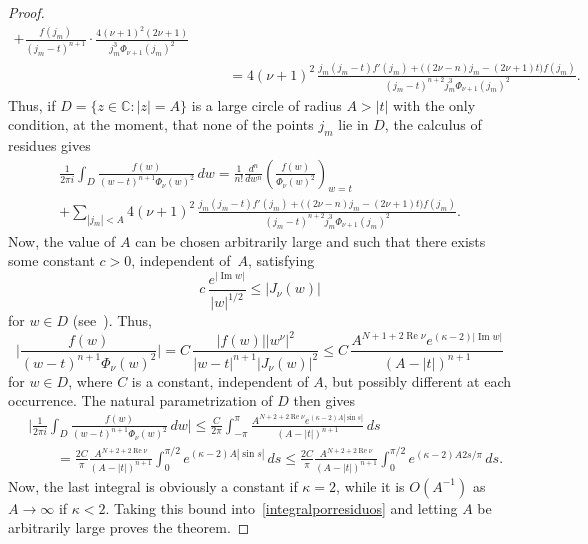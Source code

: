 \documentclass[10pt,leqno,a4paper]{article}
\theoremstyle{plain}
\newcommand{\CC}{\mathbb{C}}
\renewcommand{\Im}{\operatorname{Im}}
\renewcommand{\Re}{\operatorname{Re}}
\numberwithin{equation}{section}
\begin{document}
\begin{proof}
\begin{align*}
   + \frac{f(j_m)}{(j_m-t)^{n+1}}
   \cdot \frac{4 (\nu+1)^2 (2\nu+1)}{j_m^3 \Phi_{\nu+1}(j_m)^2}
   \\
   &\qquad= 4(\nu+1)^2 \, \frac{j_m (j_m-t) f'(j_m) + \big((2\nu-n) j_m - (2\nu+1) t\big) f(j_m)}
   {(j_m-t)^{n+2} j_m^3 \Phi_{\nu+1}(j_m)^2}.
\end{align*}
Thus, if $D = \{z \in \CC : |z| = A\}$ is a large circle of radius $A > |t|$ with the only condition, at the moment, that none of the points $j_m$ lie in $D$, the calculus of residues gives
\begin{multline}
\label{integralporresiduos}
   \frac{1}{2\pi i} \int_D \frac{f(w)}{(w-t)^{n+1} \Phi_\nu(w)^2} \, dw
   = \frac{1}{n!} \frac{d^n}{dw^n} \left( \frac{f(w)}{\Phi_\nu(w)^2} \right)_{w=t}
   \\
   + \sum_{|j_m| < A} 4(\nu+1)^2 \,
   \frac{j_m (j_m-t) f'(j_m) + \big((2\nu-n) j_m - (2\nu+1) t\big) f(j_m)}
   {(j_m-t)^{n+2} j_m^3 \Phi_{\nu+1}(j_m)^2}.
\end{multline}
Now, the value of $A$ can be chosen arbitrarily large and such that there exists some constant $c>0$, independent of~$A$, satisfying
\[
   c\, \frac{e^{|\Im w|}}{|w|^{1/2}} \leq |J_\nu(w)|
\]
for $w \in D$ (see~\cite[formula (2.4)]{DPV}). Thus,
\[
   \bigg| \frac{f(w)}{(w-t)^{n+1} \Phi_\nu(w)^2} \bigg|
   = C\, \frac{|f(w)| |w^\nu|^2}{|w-t|^{n+1} |J_\nu(w)|^2}
   \leq C\, \frac{A^{N+1 + 2\Re\nu} e^{(\kappa-2)|\Im w|}}{(A - |t|)^{n+1}}
\]
for $w \in D$, where $C$ is a constant, independent of $A$, but possibly different at each occurrence. The natural parametrization of $D$ then gives
\begin{align*}
   &\bigg| \frac{1}{2\pi i} \int_D \frac{f(w)}{(w-t)^{n+1} \Phi_\nu(w)^2} \, dw \bigg|
   \leq \frac{C}{2\pi} \int_{-\pi}^\pi
   \frac{A^{N+2 + 2\Re\nu} e^{(\kappa-2)A|\sin s|}}{(A - |t|)^{n+1}} \, ds
   \\
   &\qquad = \frac{2C}{\pi} \frac{A^{N+2 + 2\Re\nu}}{(A - |t|)^{n+1}}
   \int_0^{\pi/2} e^{(\kappa-2)A|\sin s|} \, ds
   \leq \frac{2C}{\pi} \frac{A^{N+2 + 2\Re\nu}}{(A - |t|)^{n+1}}
   \int_0^{\pi/2} e^{(\kappa-2)A 2s/\pi} \, ds.
\end{align*}
Now, the last integral is obviously a constant if $\kappa = 2$, while it is $O(A^{-1})$ as $A\to\infty$ if $\kappa < 2$.
Taking this bound into~\eqref{integralporresiduos} and letting $A$ be arbitrarily large proves the theorem.
\end{proof}
\end{document}
